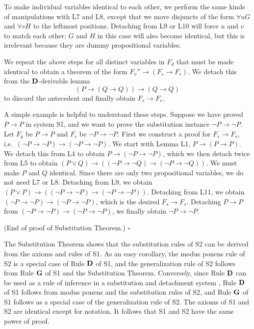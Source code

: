 \documentclass[leqno]{article}
\begin{document}
     To make individual variables identical to each other, we perform the same
kinds of manipulations with L7 and L8, except that we move disjuncts of the
form $\forall uG$ and $\forall vH$ to the leftmost positions.  Detaching from
L9 or L10 will force $u$ and $v$ to match each other; $G$ and $H$ in this case
will also become identical, but this is irrelevant because they are dummy
propositional variables.

     We repeat the above steps for all distinct variables in $F_d$ that must
be made identical to obtain a theorem of the form $F_v''\rightarrow
(F_s\rightarrow F_s)$.  We detach this from the ${\bf D}$-derivable lemma
\begin{equation} %
   (P\rightarrow (Q\rightarrow Q))\rightarrow (Q\rightarrow Q)
\end{equation}
to discard the antecedent and finally obtain $F_s\rightarrow F_s$.

     A simple example is helpful to understand these steps.  Suppose we have
proved $P\rightarrow P$ in system S1, and we want to prove the substitution
instance $\lnot P\rightarrow \lnot P$.  Let $F_g$ be $P\rightarrow P$ and
$F_s$ be $\lnot P\rightarrow \lnot P$.  First we construct a proof for
$F_s\rightarrow F_s$, i.e.\ $(\lnot P\rightarrow \lnot P)\rightarrow (\lnot
P\rightarrow \lnot P)$.  We start with Lemma L1, $P\rightarrow (P\rightarrow
P)$.  We detach this from L4 to obtain $P\rightarrow (\lnot P\rightarrow \lnot
P)$, which we then detach twice from L5 to obtain $(P\vee Q)\rightarrow
((\lnot P\rightarrow \lnot Q)\rightarrow (\lnot P\rightarrow \lnot Q))$.  We
must make $P$ and $Q$ identical.  Since there are only two propositional
variables, we do not need L7 or L8.  Detaching from L9, we obtain $(P\vee
P)\rightarrow ((\lnot P\rightarrow \lnot P)\rightarrow (\lnot P\rightarrow
\lnot P))$.  Detaching from L11, we obtain $(\lnot P\rightarrow \lnot
P)\rightarrow (\lnot P\rightarrow \lnot P)$, which is the desired
$F_s\rightarrow F_s$.  Detaching $P\rightarrow P$ from $(\lnot P\rightarrow
\lnot P)\rightarrow (\lnot P\rightarrow \lnot P)$, we finally obtain $\lnot
P\rightarrow \lnot P$.

(End of proof of Substitution Theorem.) \hfill $\square$


     The Substitution Theorem shows that the substitution rules of S2 can be
derived from the axioms and rules of S1.  As an easy corollary, the
modus ponens rule of S2 is a special case of Rule ${\bf D}$ of S1, and the
generalization rule of S2 follows from Rule ${\bf G}$ of S1 and the
Substitution Theorem.  Conversely, since Rule ${\bf D}$ can be used as a rule
of inference in a substitution and detachment system \cite{Kalman}, Rule ${\bf
D}$ of S1 follows from modus ponens and the substitution rules of S2, and Rule
${\bf G}$ of S1 follows as a special case of the generalization rule of S2.
The axioms of S1 and S2 are identical except for notation.  It follows that S1
and S2 have the same power of proof.
\end{document}
